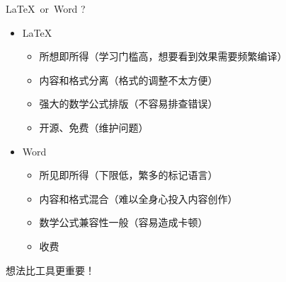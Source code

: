 \begin{frame}{\LaTeX~or~Word ?}
  \begin{itemize}
    \item \LaTeX
          \begin{itemize}
            \item 所想即所得（学习门槛高，想要看到效果需要频繁编译）
            \item 内容和格式分离（格式的调整不太方便）
            \item 强大的数学公式排版（不容易排查错误）
            \item 开源、免费（维护问题）
          \end{itemize}
    \item Word
          \begin{itemize}
            \item 所见即所得（下限低，繁多的标记语言）
            \item 内容和格式混合（难以全身心投入内容创作）
            \item 数学公式兼容性一般（容易造成卡顿）
            \item 收费
          \end{itemize}
  \end{itemize}
  \textcolor{tip}{想法比工具更重要！}
\end{frame}

